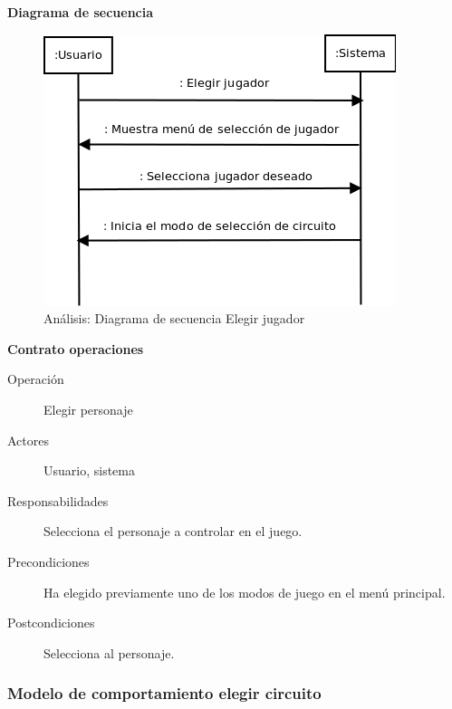 \textbf{Diagrama de secuencia}
\begin{figure}[H]
  \label{dia_elegir_jugador}
  \begin{center}
    \includegraphics[scale=0.5]{imagenes/dia_elegir_jugador.png}
  \end{center}
  \caption{Análisis: Diagrama de secuencia Elegir jugador}
\end{figure}

\textbf{Contrato operaciones}

\begin{description}
    \item[Operación] Elegir personaje
    \item[Actores]  Usuario, sistema
    \item[Responsabilidades] Selecciona el personaje a controlar en el juego.
    \item[Precondiciones] Ha elegido previamente uno de los modos de juego en el menú principal.
    \item[Postcondiciones] Selecciona al personaje.
\end{description}

\subsubsection{Modelo de comportamiento elegir circuito}

